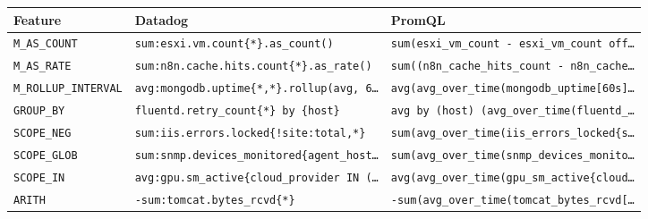 \begin{tabular}{@{}lll@{}}
\toprule
Feature & Datadog & PromQL \\
\midrule
\texttt{M\_AS\_COUNT} & \texttt{sum:esxi.vm.count\{*\}.as\_count()} & \texttt{sum(esxi\_vm\_count - esxi\_vm\_count off\dots{}} \\
\texttt{M\_AS\_RATE} & \texttt{sum:n8n.cache.hits.count\{*\}.as\_rate()} & \texttt{sum((n8n\_cache\_hits\_count - n8n\_cache\dots{}} \\
\texttt{M\_ROLLUP\_INTERVAL} & \texttt{avg:mongodb.uptime\{*,*\}.rollup(avg, 6\dots{}} & \texttt{avg(avg\_over\_time(mongodb\_uptime[60s]\dots{}} \\
\texttt{GROUP\_BY} & \texttt{fluentd.retry\_count\{*\} by \{host\}} & \texttt{avg by (host) (avg\_over\_time(fluentd\_\dots{}} \\
\texttt{SCOPE\_NEG} & \texttt{sum:iis.errors.locked\{!site:total,*\}} & \texttt{sum(avg\_over\_time(iis\_errors\_locked\{s\dots{}} \\
\texttt{SCOPE\_GLOB} & \texttt{sum:snmp.devices\_monitored\{agent\_host\dots{}} & \texttt{sum(avg\_over\_time(snmp\_devices\_monito\dots{}} \\
\texttt{SCOPE\_IN} & \texttt{avg:gpu.sm\_active\{cloud\_provider IN (\dots{}} & \texttt{avg(avg\_over\_time(gpu\_sm\_active\{cloud\dots{}} \\
\texttt{ARITH} & \texttt{-sum:tomcat.bytes\_rcvd\{*\}} & \texttt{-sum(avg\_over\_time(tomcat\_bytes\_rcvd[\dots{}} \\
\bottomrule
\end{tabular}
